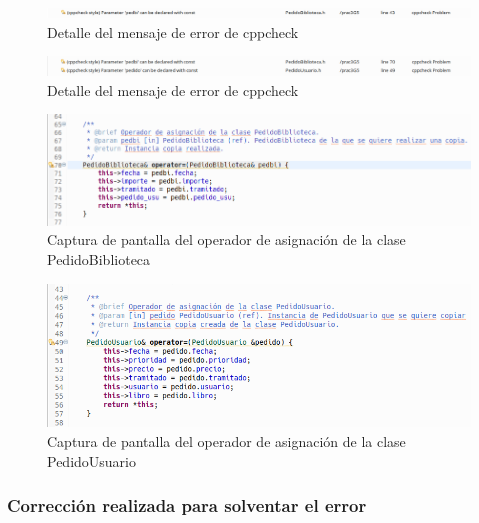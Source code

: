 		\begin{figure}[H]
			\centering
			\includegraphics[scale=0.38]{img/captura55.png}
			\caption{Detalle del mensaje de error de cppcheck}
			\label{captura55}
		\end{figure}
	
		\begin{figure}[H]
			\centering
			\includegraphics[scale=0.38]{img/captura61.png}
			\caption{Detalle del mensaje de error de cppcheck}
			\label{captura61}
		\end{figure}
	
		\begin{figure}[H]
			\centering
			\includegraphics[scale=0.5]{img/captura57.png}
			\caption{Captura de pantalla del operador de asignación de la clase PedidoBiblioteca}
			\label{captura57}
		\end{figure}
	
		\begin{figure}[H]
			\centering
			\includegraphics[scale=0.55]{img/captura58.png}
			\caption{Captura de pantalla del operador de asignación de la clase PedidoUsuario}
			\label{captura58}
		\end{figure}
	
		\subsubsection{Corrección realizada para solventar el error}
		
